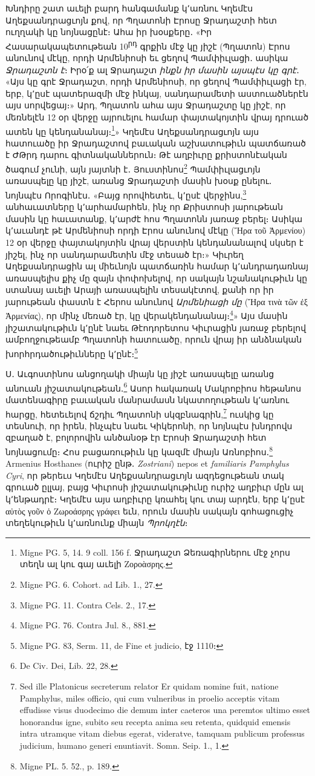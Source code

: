 \documentclass{article}
\begin{document}
{Խնդիրը շատ աւելի բարդ հանգամանք կ՚առնու Կղեմէս Աղեքսանդրացւոյն քով, որ Պղատոնի Էրոսը Ջրադաշտի հետ ուղղակի կը նոյնացընէ։ Ահա իր խօսքերը․ «Իր Հասարակապետութեան 10\textsuperscript{րդ} գրքին մէջ կը յիշէ (Պղատոն) Էրոս անունով մէկը, որդի Արմենիոսի եւ ցեղով Պամփիւլացի․ ասիկա \emph{Ջրադաշտն է}։ Իրօ՛ք ալ Ջրադաշտ \emph{ինքն իր մասին այսպէս կը գրէ}․ «Այս կը գրէ Ջրադաշտ, որդի Արմենիոսի, որ ցեղով Պամփիւլացի էր, երբ, կ՚ըսէ պատերազմի մէջ ինկայ, սանդարամետի աստուածներէն այս սորվեցայ։» Արդ, Պղատոն ահա այս Ջրադաշտը կը յիշէ, որ մեռնելէն 12 օր վերջը այրուելու համար փայտակոյտին վրայ դրուած ատեն կը կենդանանայ։\footnote{Migne PG. 5, 14. 9 coll. 156 f. Ջրադաշտ Ձեռագիրներու մէջ չորս տեղն ալ կու գայ աւելի Ζοροὰσρης.}» Կղեմէս Աղեքսանդրացւոյն այս հատուածը իր Ջրադաշտով բաւական աշխատութիւն պատճառած է ԺԹրդ դարու գիտնականներուն։ Թէ աղբիւրը քրիստոնէական ծագում չունի, այն յայտնի է․ Յուստինոս\footnote{Migne PG. 6. Cohort. ad Lib. 1., 27.} Պամփիւլացւոյն առասպելը կը յիշէ, առանց Ջրադաշտի մասին խօսք ընելու․ նոյնպէս Որոգինէս․ «Բայց որովհետեւ, կ՚ըսէ վերջինս,\footnote{Migne PG. 11. Contra Cels. 2., 17.} անհաւատները կ՚արհամարհեն, ինչ որ Քրիստոսի յարութեան մասին կը հաւատանք, կ՚արժէ հոս Պղատոնն յառաջ բերել։ Ասիկա կ՚աւանդէ թէ Արմենիոսի որդի Էրոս անունով մէկը (Ἤρα τοῦ Ἀρμενίου) 12 օր վերջը փայտակոյտին վրայ վերստին կենդանանալով սկսեր է յիշել, ինչ որ սանդարամետին մէջ տեսած էր։» Կիւրեղ Աղեքսանդրացին ալ միեւնոյն պատճառին համար կ՚անդրադառնայ առասպելիս քիչ մը զայն փոփոխելով, որ սակայն նշանակութիւն կը ստանայ աւելի Արայի առասպելին տեսակէտով, քանի որ իր յարութեան փաստն է Հերոս անունով \emph{Արմենիացի մը} (Ἥρα τινὰ τῶν ἐξ Ἀρμενίας), որ մինչ մեռած էր, կը վերակենդանանայ։\footnote{Migne PG. 76. Contra Jul. 8., 881.}» Այս մասին յիշատակութիւն կ՚ընէ նաեւ Թէոդորետոս Կիւրացին յառաջ բերելով ամբողջութեամբ Պղատոնի հատուածը, որուն վրայ իր անձնական խորհրդածութիւնները կ՚ընէ։\footnote{Migne PG. 83, Serm. 11, de Fine et judicio, էջ 1110։}

Ս․ Աւգոստինոս անցողակի միայն կը յիշէ առասպելը առանց անուան յիշատակութեան․\footnote{De Civ. Dei, Lib. 22, 28.} Ասոր հակառակ Մակրոբիոս հեթանոս մատենագիրը բաւական մանրամասն նկատողութեան կ՚առնու հարցը, հետեւելով ճշդիւ Պղատոնի սկզբնագրին,\footnote{Sed ille Platonicus secreterum relator Er quidam nomine fuit, natione Pamphylus, miles officio, qui cum vulneribus in proelio acceptis vitam effudisse visus duodecimo die demum inter caeteros una peremtos ultimo esset honorandus igne, subito seu recepta anima seu retenta, quidquid emensis intra utramque vitam diebus egerat, videratve, tamquam publicum professus judicium, humano generi enuntiavit. Somn. Seip. 1., 1.} ուսկից կը տեսնուի, որ իրեն, ինչպէս նաեւ Կիկերոնի, որ նոյնպէս խնդրովս զբաղած է, բոլորովին անծանօթ էր Էրոսի Ջրադաշտի հետ նոյնացումը։ Հոս բացառութիւն կը կազմէ միայն Առնոբիոս․\footnote{Migne PL. 5. 52., p. 189.} Armenius Hosthanes (ուրիշ ընթ․ \emph{Zostriani}) nepos et \emph{familiaris Pamphylus Cyri}, որ թերեւս Կղեմէս Աղեքսանդրացւոյն ազդեցութեան տակ գրուած ըլլայ, բայց Կիւրոսի յիշատակութիւնը ուրիշ աղբիւր մըն ալ կ՚ենթադրէ։ Կղեմէս այս աղբիւրը կռահել կու տայ արդէն, երբ կ՚ըսէ αὐτὸς γοῦν ὁ Ζωροάσρης γράφει եւն, որուն մասին սակայն գոհացուցիչ տեղեկութիւն կ՚առնունք միայն \emph{Պրոկղէն}։

}
\end{document}
